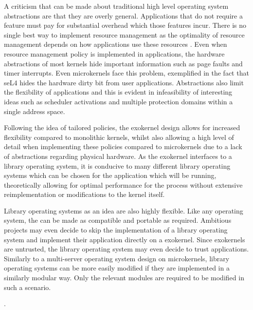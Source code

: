\documentclass[../thesis.tex]{subfiles}
\begin{document}
    A criticism that can be made about traditional high level operating system abstractions are that they are overly general. Applications that do not require a feature must pay for substantial overhead which those features incur.  There is no single best way to implement resource management as the optimality of resource management depends on how applications use these resources . Even when resource management policy is implemented in applications, the hardware abstractions of most kernels hide important information such as page faults and timer interrupts. Even microkernels face this problem, exemplified in the fact that seL4 hides the hardware dirty bit from user applications.  Abstractions also limit the flexibility of applications and this is evident in infeasibility of interesting ideas such as scheduler activations and multiple protection domains within a single address space. 

Following the idea of tailored policies, the exokernel design allows for increased flexibility compared to monolithic kernels, whilst also allowing a high level of detail when implementing these policies compared to microkernels due to a lack of abstractions regarding physical hardware. As the exokernel interfaces to a library operating system, it is conducive to many different library operating systems which can be chosen for the application which will be running, theoretically allowing for optimal performance for the process without extensive reimplementation or modifications to the kernel itself.

Library operating systems as an idea are also highly flexible. Like any operating system, the can be made as compatible and portable as required. Ambitious projects may even decide to skip the implementation of a library operating system and implement their application directly on a exokernel. Since exokernels are untrusted, the library operating system may even decide to trust applications. Similarly to a multi-server operating system design on microkernels, library operating systems can be more easily modified if they are implemented in a similarly modular way. Only the relevant modules are required to be modified in such a scenario.

.
\end{document}
